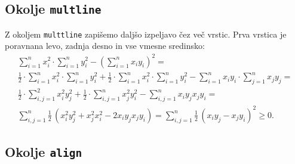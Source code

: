 \documentclass{amsart}
\begin{document}
\subsection{Okolje \texttt{multline}}

Z okoljem \texttt{multtline} zapišemo daljšo izpeljavo čez več vrstic. Prva vrstica je
poravnana levo, zadnja desno in vse vmesne sredinsko:
%
\begin{multline*}
  \sum_{i=1}^n x_i^2 \cdot \sum_{i=1}^n y_i^2
  - \left( \sum_{i=1}^n x_i y_i \right)^2 = \\
  \frac{1}{2} \cdot \sum_{i=1}^n x_i^2 \cdot \sum_{i=1}^n y_i^2
  +
  \frac{1}{2} \cdot \sum_{i=1}^n x_i^2 \cdot \sum_{i=1}^n y_i^2
  -
  \sum_{i=1}^n x_i y_i \cdot \sum_{j=1}^n x_j y_j = \\
  \frac{1}{2} \cdot \sum_{i,j=1}^2 x_i^2 y_j^2
  +
  \frac{1}{2} \cdot \sum_{i,j=1}^n x_j^2 y_i^2
  -
  \sum_{i,j=1}^n x_i y_j x_j y_i = \\
  \sum_{i,j=1}^n \frac{1}{2}\,
  \left(
    x_i^2 y_j^2 + x_j^2 x_i^2 - 2 x_i y_j x_j y_i
  \right)
  =
  \sum_{i,j=1}^n \frac{1}{2}\,
  \left(
    x_i y_j - x_j y_i
  \right)^2
  \geq 0.
\end{multline*}


\subsection{Okolje \texttt{align}}
\end{document}
